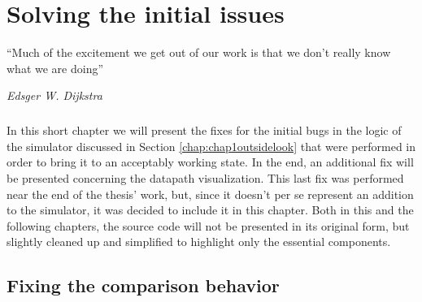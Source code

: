 \chapter{Solving the initial issues}\label{chap:chap3}

\epigraph{``Much of the excitement we get out of our work is that we don't really know what we are doing''}{\textit{Edsger W. Dijkstra}}

\paragraph{}
In this short chapter we will present the fixes for the initial bugs in the logic of the simulator discussed in Section \ref{chap:chap1outsidelook} that were performed in order to bring it to an acceptably working state. In the end, an additional fix will be presented concerning the datapath visualization. This last fix was performed near the end of the thesis' work, but, since it doesn't per se represent an addition to the simulator, it was decided to include it in this chapter. Both in this and the following chapters, the source code will not be presented in its original form, but slightly cleaned up and simplified to highlight only the essential components.

\section{Fixing the comparison behavior}
